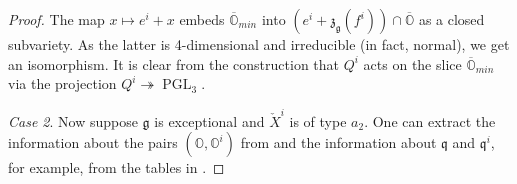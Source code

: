 \documentclass[12pt]{amsart}
\newcommand{\g}{\mathfrak{g}}
\newcommand{\Orb}{\mathbb{O}}
\theoremstyle{definition}
\numberwithin{equation}{section}
\begin{document}
\begin{proof}
The map
$x\mapsto e^i+x$ embeds $\overline{\Orb}_{min}$ into $(e^i+\mathfrak{z}_{\g}(f^i))\cap \overline{\Orb}$
as a closed subvariety. As the latter is 4-dimensional and irreducible (in fact, normal), we get an
isomorphism. It is clear from the construction that $Q^i$ acts on the slice $\overline{\Orb}_{min}$
via the projection $Q^i\twoheadrightarrow \operatorname{PGL}_3$.

{\it Case 2}. Now suppose $\g$ is exceptional and $\check{X}^i$ is of type $a_2$. One can extract
the information about the pairs $(\Orb,\Orb^i)$ from \cite{FJLS1} and the information about $\mathfrak{q}$
and $\mathfrak{q}^i$, for example, from the tables in \cite[Section 13.1]{Carter}. %


\end{proof}
\end{document}
